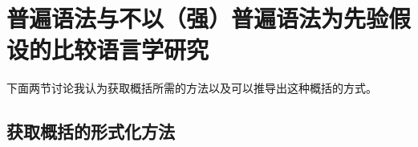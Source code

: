 
\chapter[普遍语法与没有普遍语法的比较语言学]{普遍语法与不以（强）普遍语法为先验假设的比较语言学研究}
\label{Abschnitt-UG-mit-Hierarchie}

下面两节讨论我认为获取概括所需的方法以及可以推导出这种概括的方式。

\section{获取概括的形式化方法}

